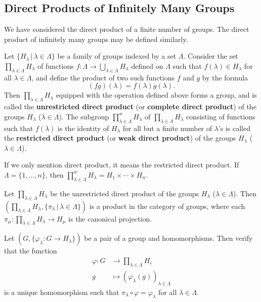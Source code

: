 \subsection{Direct Products of Infinitely Many Groups}
We have considered the direct product of a finite
number of groups. The direct product of infinitely many groups may be
defined similarly.
\begin{definition}
	Let $\{H_\lambda\,|\, \lambda\in \Lambda\}$ be a family of groups indexed by a set $\Lambda$. Consider the set $\prod_{\lambda\in \Lambda} H_\lambda$ of functions $f:\Lambda \rightarrow \bigcup_{\lambda\in \Lambda}H_\lambda$ defined on $\Lambda$ such that $f(\lambda) \in H_\lambda$ for all $\lambda \in \Lambda$, and define the product of two such functions $f$ and $g$ by the formula
	$$(fg)(\lambda) = f(\lambda)g(\lambda).$$
	Then $\prod_{\lambda\in \Lambda} H_\lambda$ equipped with the operation defined above forms a group, and is called the \textbf{unrestricted direct product} (or \textbf{complete direct product}) of the groups $H_\lambda$ ($\lambda \in \Lambda$). The subgroup $\prod_{\lambda\in \Lambda}^w H_\lambda$ of $\prod_{\lambda\in \Lambda} H_\lambda$ consisting of functions such that $f(\lambda)$ is the identity of $H_\lambda$ for all but a finite number of $\lambda$'s is called the \textbf{restricted direct product} (or \textbf{weak direct product}) of the groups $H_\lambda$ ($\lambda \in \Lambda$).
\end{definition}

\begin{remark} If we only mention direct product, it means the restricted direct product.
	If $\Lambda = \{1,\dots, n\}$, then $\prod_{\lambda\in \Lambda}^w H_\lambda = H_1\times \cdots \times H_n$.
\end{remark}

\begin{theorem}
	Let $\prod_{\lambda\in\Lambda} H_{\lambda}$ be the unrestricted direct product of the groups $H_\lambda$ ($\lambda \in \Lambda$). Then $\left(\prod_{\lambda\in\Lambda} H_{\lambda}, \{\pi_\lambda\,|\, \lambda\in\Lambda\}\right)$ is a product in the category of groups, where each $\pi_\mu: \prod_{\lambda\in\Lambda} H_\lambda \rightarrow H_\mu$ is the canonical projection.
\end{theorem}
\begin{sketch}
	Let $(G, \{\varphi_\lambda: G\rightarrow H_\lambda\})$ be a pair of a group and homomorphisms. Then verify that the function
	\begin{align*}
		\varphi:G&\rightarrow\prod_{\lambda\in \Lambda} H_i
		\\
		g&\mapsto (\varphi_{\lambda}(g))_{\lambda\in\Lambda}
	\end{align*} 
	is a unique homomorphism such that $\pi_\lambda\circ \varphi = \varphi_\lambda$ for all $\lambda\in\Lambda$. 
\end{sketch}

